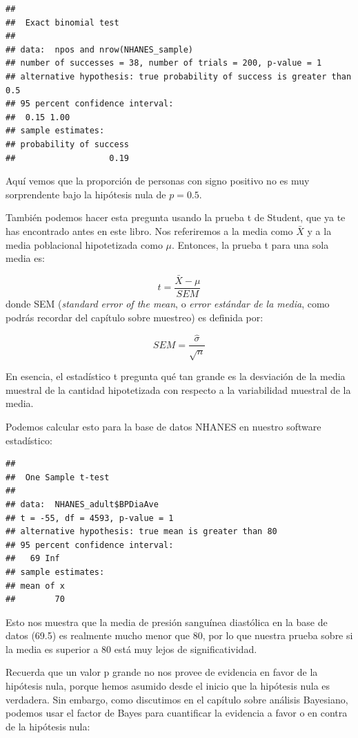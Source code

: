 \documentclass[
  12pt,
]{book}
\begin{document}
\begin{verbatim}
## 
## 	Exact binomial test
## 
## data:  npos and nrow(NHANES_sample)
## number of successes = 38, number of trials = 200, p-value = 1
## alternative hypothesis: true probability of success is greater than 0.5
## 95 percent confidence interval:
##  0.15 1.00
## sample estimates:
## probability of success 
##                   0.19
\end{verbatim}

Aquí vemos que la proporción de personas con signo positivo no es muy sorprendente bajo la hipótesis nula de \(p=0.5\).

También podemos hacer esta pregunta usando la prueba t de Student, que ya te has encontrado antes en este libro. Nos referiremos a la media como \(\bar{X}\) y a la media poblacional hipotetizada como \(\mu\). Entonces, la prueba t para una sola media es:

\[
t = \frac{\bar{X} - \mu}{SEM}
\]
donde SEM (\emph{standard error of the mean}, o \emph{error estándar de la media}, como podrás recordar del capítulo sobre muestreo) es definida por:

\[
SEM = \frac{\hat{\sigma}}{\sqrt{n}}
\]

En esencia, el estadístico t pregunta qué tan grande es la desviación de la media muestral de la cantidad hipotetizada con respecto a la variabilidad muestral de la media.

Podemos calcular esto para la base de datos NHANES en nuestro software estadístico:

\begin{verbatim}
## 
## 	One Sample t-test
## 
## data:  NHANES_adult$BPDiaAve
## t = -55, df = 4593, p-value = 1
## alternative hypothesis: true mean is greater than 80
## 95 percent confidence interval:
##   69 Inf
## sample estimates:
## mean of x 
##        70
\end{verbatim}

Esto nos muestra que la media de presión sanguínea diastólica en la base de datos (69.5) es realmente mucho menor que 80, por lo que nuestra prueba sobre si la media es superior a 80 está muy lejos de significatividad.

Recuerda que un valor p grande no nos provee de evidencia en favor de la hipótesis nula, porque hemos asumido desde el inicio que la hipótesis nula es verdadera. Sin embargo, como discutimos en el capítulo sobre análisis Bayesiano, podemos usar el factor de Bayes para cuantificar la evidencia a favor o en contra de la hipótesis nula:
\end{document}

